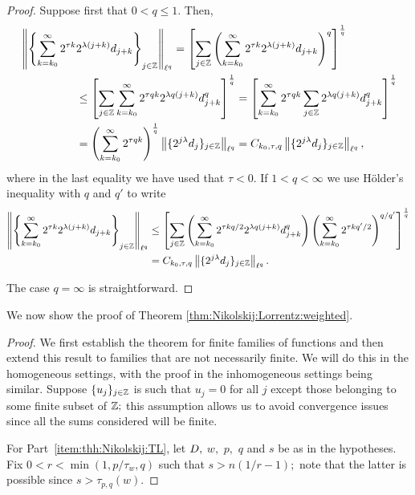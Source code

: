 {\begin{proof}
Suppose first that $0 < q \leq 1$. Then,
\begin{align*}
& \left\|\left\{\sum_{k=k_0}^\infty 2^{\tau k} 2^{\lambda(j+k)}d_{j+k}\right\}_{j\in \mathbb{Z}}\right\|_{\ell^q} = \left[\sum_{j \in \mathbb{Z}} \left( \sum_{k=k_0}^\infty 2^{\tau k} 2^{\lambda(j+k)}d_{j+k} \right)^q \right]^\frac{1}{q}\\
& \quad\quad\quad\quad\quad \leq  \left[\sum_{j \in \mathbb{Z}}  \sum_{k=k_0}^\infty 2^{\tau q k} 2^{\lambda q (j+k)}d_{j+k}^q \right]^\frac{1}{q} =  \left[ \sum_{k=k_0}^\infty  2^{\tau q k} \sum_{j \in \mathbb{Z}} 2^{\lambda q (j+k)}d_{j+k}^q \right]^\frac{1}{q}\\
&  \quad\quad\quad \quad \quad = \left(  \sum_{k=k_0}^\infty   2^{\tau q k}     \right)^\frac{1}{q} \left\|\{2^{j \lambda} d_j\}_{j\in \mathbb{Z}}\right\|_{\ell^q} = C_{k_0, \tau, q} \left\|\{2^{j \lambda} d_j\}_{j\in\mathbb{Z}}\right\|_{\ell^q},
\end{align*}
where in the last equality we have used that $\tau < 0$. If $1 < q < \infty$ we use H\"older's inequality with $q$ and $q'$ to write
\begin{align*}
 \left\|\left\{\sum_{k=k_0}^\infty 2^{\tau k} 2^{\lambda(j+k)}d_{j+k}\right\}_{j\in\mathbb{Z}}\right\|_{\ell^q} 
& \le \left[\sum_{j \in \mathbb{Z}}   \left(\sum_{k=k_0}^\infty 2^{\tau k q/2} 2^{\lambda q(j+k)}d_{j+k}^q \right)     \left( \sum_{k=k_0}^\infty 2^{\tau kq'/2} \right)^{q/q'}   \right]^\frac{1}{q}\\
&    =C_{k_0, \tau, q} \left\|\{2^{j \lambda} d_j\}_{j\in\mathbb{Z}}\right\|_{\ell^q}.
\end{align*}

The case $q = \infty$ is straightforward.
\end{proof}

We now show the proof of Theorem \ref{thm:Nikolskij:Lorrentz:weighted}.

\begin{proof} We first establish the theorem for finite families of functions and then extend this result to families that are not necessarily finite.  We will do this in the homogeneous settings, with the proof in the inhomogeneous settings being similar. Suppose $\{u_j\}_{j\in\mathbb{Z}}$ is such that $u_j=0$ for all $j$ except those belonging to some finite subset of $\mathbb{Z};$  this assumption allows us to avoid convergence issues since all the sums  considered will be finite.

For Part~\eqref{item:thh:Nikolskij:TL}, let $D,$ $w,$ $p,$ $q$ and $s$ be as in the hypotheses. Fix $0<r<\min(1,p/\tau_w,q)$ such that  $s>n(1/r-1);$ note that the latter is possible since $s>\tau_{p,q}(w).$ 



\end{proof}}

